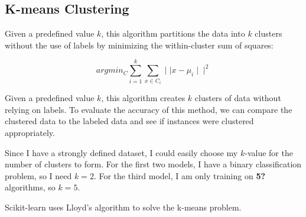 \subsection{K-means Clustering}
Given a predefined value $k$, this algorithm partitions the data into $k$ clusters without the use of labels by minimizing the within-cluster sum of squares:

\begin{equation}
argmin_C \sum_{i=1}^k \sum_{x\in C_i} \mid \mid  x-\mu_i \mid \mid ^2\label{kmeans}
\end{equation}

Given a predefined value $k$, this algorithm creates $k$ clusters of data without relying on labels.  To evaluate the accuracy of this method, we can compare the clustered data to the labeled data and see if instances were clustered appropriately.


Since I have a strongly defined dataset, I could easily choose my $k$-value for the number of clusters to form.  For the first two models, I have a binary classification problem, so I need $k=2$.  For the third model, I am only training on \textbf{5?} algorithms, so $k=5$.

Scikit-learn uses Lloyd's algorithm\cite{lloyd} to solve the k-means problem.


